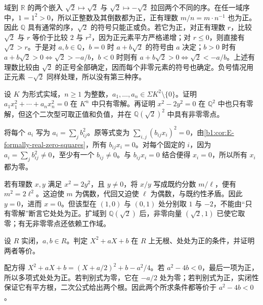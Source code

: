 \begin{solution}
	域到 \(\mathbb R\) 的两个嵌入 \(\sqrt2\mapsto\sqrt2\) 与 \(\sqrt2\mapsto-\sqrt2\) 拉回两个不同的序。在任一域序中，\(1=1^2>0\)，所以正整数及其倒数都为正，正有理数 \(m/n=m\cdot n^{-1}\) 也为正。因此 \(\mathbb Q\) 具有通常的序，\(\sqrt2\) 的符号只能正或负。若它为正，对正有理数 \(r\)，比较 \(\sqrt2\) 与 \(r\) 等价于比较 \(2\) 与 \(r^2\)，因为正元素平方严格递增；对 \(r\leq0\)，则直接有 \(\sqrt2>r\)。于是对 \(a,b\in\mathbb Q\)，\(b=0\) 时 \(a+b\sqrt2\) 的符号由 \(a\) 决定；\(b>0\) 时有 \(a+b\sqrt2>0\iff\sqrt2>-a/b\)，\(b<0\) 时则有 \(a+b\sqrt2>0\iff\sqrt2<-a/b\)。上述有理数比较由 \(\sqrt2\) 的正号全部确定，因而每个非零元素的符号也确定。负号情况用正元素 \(-\sqrt2\) 同样处理，所以没有第三种序。
\end{solution}

\begin{exercise}\label{b1:ex:E-sum-squares-zero}
	设 \(K\) 为形式实域，\(n\geq1\) 为整数，\(a_1,\ldots,a_n\in\Sigma K^2\setminus\{0\}\)。证明 \(a_1x_1^2+\cdots+a_nx_n^2=0\) 在 \(K^n\) 中只有零解。再证明 \(x^2-2y^2=0\) 在 \(\mathbb Q^2\) 中也只有零解，但这个二次型可取正值和负值，并在 \(\mathbb Q(\sqrt2)^2\) 中具有非零零点。
\end{exercise}

\begin{solution}
	将每个 \(a_i\) 写为 \(a_i=\sum_j b_{ij}^2\)。原等式变为 \(\sum_{i,j}(b_{ij}x_i)^2=0\)，由\cref{b1:cor:E-formally-real-zero-squares}，所有 \(b_{ij}x_i=0\)。对每个固定的 \(i\)，因为 \(a_i=\sum_jb_{ij}^2\neq0\)，至少有一个 \(b_{ij}\neq0\)。与 \(b_{ij}x_i=0\) 结合便得 \(x_i=0\)，所以所有 \(x_i\) 都为零。

	若有理数 \(x,y\) 满足 \(x^2=2y^2\)，且 \(y\neq0\)，将 \(x/y\) 写成既约分数 \(m/\ell\)，便有 \(m^2=2\ell^2\)。这迫使 \(m\) 为偶数，代回又迫使 \(\ell\) 为偶数，与既约性矛盾。因此 \(y=0\)，进而 \(x=0\)。但该型在 \((1,0)\) 与 \((0,1)\) 处分别取 \(1\) 与 \(-2\)，不能由“只有零解”断言它处处为正。扩域到 \(\mathbb Q(\sqrt2)\) 后，非零向量 \((\sqrt2,1)\) 已使它取零；有无非零零点还依赖工作域。
\end{solution}

\begin{exercise}\label{b1:ex:E-quadratic-positive}
	设 \(R\) 实闭，\(a,b\in R\)。判定 \(X^2+aX+b\) 在 \(R\) 上无根、处处为正的条件，并证明两者等价。
\end{exercise}

\begin{solution}
	配方得 \(X^2+aX+b=(X+a/2)^2+b-a^2/4\)。若 \(a^2-4b<0\)，最后一项为正，所以多项式处处为正。若判别式为零，它在 \(-a/2\) 处为零；若判别式为正，实闭性保证它有平方根，二次公式给出两个根。因此两个所求条件都等价于 \(a^2-4b<0\)。
\end{solution}

